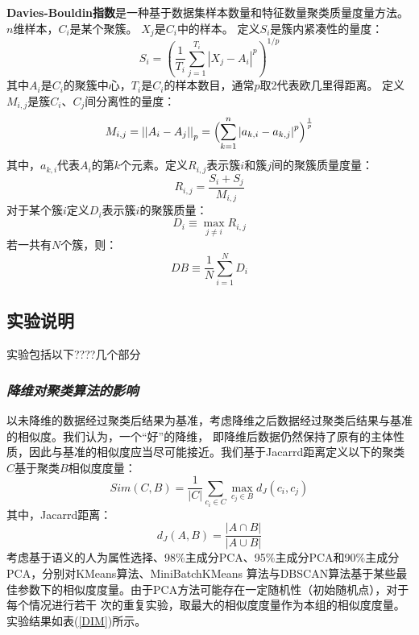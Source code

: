 \documentclass{acm_proc_article-sp}
\begin{document}
\textbf{Davies-Bouldin指数}是一种基于数据集样本数量和特征数量聚类质量度量方法。
$n$维样本，$C_i$是某个聚簇。 $X_j$是$C_i$中的样本。 定义$S_i$是簇内紧凑性的量度：
$$S_i = \left(\frac{1}{T_i} \sum_{j=1}^{T_i} {\left| X_j-A_i\right|^p}\right)^{1/p}$$
其中$A_i$是$C_i$的聚簇中心，$T_i$是$C_i$的样本数目，通常$p$取2代表欧几里得距离。
定义$M_{i,j}$是簇$C_i$、$C_j$间分离性的量度：
$$M_{i,j} = \left|\left|A_i-A_j\right|\right|_p = \Bigl(\displaystyle\sum_{k=1}^{n}\left|a_{k,i}-a_{k,j}\right|^p\Bigr)^{\frac 1 p}$$
其中，$a_{k,i}$代表$A_i$的第$k$个元素。定义$R_{i,j}$表示簇$i$和簇$j$间的聚簇质量度量：
$$R_{i,j} = \frac{S_i + S_j}{M_{i,j}}$$
对于某个簇$i$定义$D_i$表示簇$i$的聚簇质量：
$$D_i \equiv \max_{j \neq i} R_{i,j}$$
若一共有$N$个簇，则：
$$\mathit{DB} \equiv \frac{1}{N}\displaystyle\sum_{i=1}^N D_i$$

\subsection{\textsf{实验说明}}

实验包括以下????几个部分

\subsubsection{\textit{降维对聚类算法的影响}}
以未降维的数据经过聚类后结果为基准，考虑降维之后数据经过聚类后结果与基准的相似度。我们认为，一个“好”的降维，
即降维后数据仍然保持了原有的主体性质，因此与基准的相似度应当尽可能接近。我们基于Jacarrd距离定义以下的聚类
$C$基于聚类$B$相似度度量：
$$Sim(C,B) = \frac{1}{|C|}\sum_{c_i\in C}\max_{c_j\in B}d_{J}(c_i,c_j)$$
其中，Jacarrd距离：
$$d_{J}(A,B) = \frac{|A\cap B|}{|A\cup B|}$$
考虑基于语义的人为属性选择、98\%主成分PCA、95\%主成分PCA和90\%主成分PCA，分别对KMeans算法、MiniBatchKMeans
算法与DBSCAN算法基于某些最佳参数下的相似度度量。由于PCA方法可能存在一定随机性（初始随机点），对于每个情况进行若干
次的重复实验，取最大的相似度度量作为本组的相似度度量。实验结果如表(\ref{DIM})所示。
\end{document}
